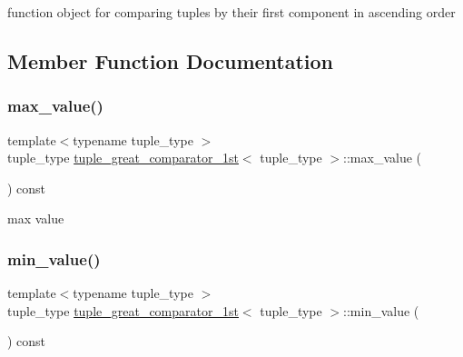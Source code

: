function object for comparing tuples by their first component in ascending order 

\subsection{Member Function Documentation}
\mbox{\label{structtuple__great__comparator__1st_ace19155455686003f7a67d51d5bb799b}} 
\subsubsection{\texorpdfstring{max\+\_\+value()}{max\_value()}}
{\footnotesize\ttfamily template$<$typename tuple\+\_\+type $>$ \\
tuple\+\_\+type \hyperlink{structtuple__great__comparator__1st}{tuple\+\_\+great\+\_\+comparator\+\_\+1st}$<$ tuple\+\_\+type $>$\+::max\+\_\+value (\begin{DoxyParamCaption}{ }\end{DoxyParamCaption}) const\hspace{0.3cm}{\ttfamily [inline]}}



max value 

\mbox{\label{structtuple__great__comparator__1st_a92e31ba8514dbfb3a98e9bf9fdccaf31}} 
\subsubsection{\texorpdfstring{min\+\_\+value()}{min\_value()}}
{\footnotesize\ttfamily template$<$typename tuple\+\_\+type $>$ \\
tuple\+\_\+type \hyperlink{structtuple__great__comparator__1st}{tuple\+\_\+great\+\_\+comparator\+\_\+1st}$<$ tuple\+\_\+type $>$\+::min\+\_\+value (\begin{DoxyParamCaption}{ }\end{DoxyParamCaption}) const\hspace{0.3cm}{\ttfamily [inline]}}



